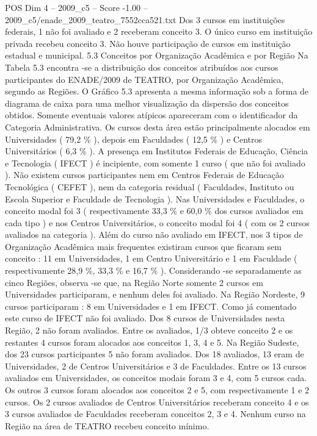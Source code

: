 \begin{textsample}{POS Dim 4 – 2009\_c5 – Score -1.00 – 2009\_c5/enade\_2009\_teatro\_7552cca521.txt}
Dos 3 cursos em instituições federais, 1 não foi avaliado e 2 receberam conceito 3.
O único curso em instituição privada recebeu conceito 3.
Não houve participação de cursos em instituição estadual e municipal. 5.3 Conceitos por Organização Acadêmica e por Região Na Tabela 5.3 encontra -se a distribuição dos conceitos atribuídos aos cursos participantes do ENADE/2009 de TEATRO, por Organização Acadêmica, segundo as Regiões.
O Gráfico 5.3 apresenta a mesma informação sob a forma de diagrama de caixa para uma melhor visualização da dispersão dos conceitos obtidos.
Somente eventuais valores atípicos apareceram com o identificador da Categoria Administrativa.
Os cursos desta área estão principalmente alocados em Universidades ( 79,2 \% ), depois em Faculdades ( 12,5 \% ) e Centros Universitários ( 6,3 \% ).
A presença em Institutos Federais de Educação, Ciência e Tecnologia ( IFECT ) é incipiente, com somente 1 curso ( que não foi avaliado ).
Não existem cursos participantes nem em Centros Federais de Educação Tecnológica ( CEFET ), nem da categoria residual ( Faculdades, Instituto ou Escola Superior e Faculdade de Tecnologia ).
Nas Universidades e Faculdades, o conceito modal foi 3 ( respectivamente 33,3 \% e 60,0 \% dos cursos avaliados em cada tipo ) e nos Centros Universitários, o conceito modal foi 4 ( com os 2 cursos avaliados na categoria ).
Além do curso não avaliado em IFECT, nos 3 tipos de Organização Acadêmica mais frequentes existiram cursos que ficaram sem conceito : 11 em Universidades, 1 em Centro Universitário e 1 em Faculdade ( respectivamente 28,9 \%, 33,3 \% e 16,7 \% ).
Considerando -se separadamente as cinco Regiões, observa -se que, na Região Norte somente 2 cursos em Universidades participaram, e nenhum deles foi avaliado.
Na Região Nordeste, 9 cursos participaram : 8 em Universidades e 1 em IFECT.
Como já comentado este curso de IFECT não foi avaliado.
Dos 8 cursos de Universidades nesta Região, 2 não foram avaliados.
Entre os avaliados, 1/3 obteve conceito 2 e os restantes 4 cursos foram alocados aos conceitos 1, 3, 4 e 5.
Na Região Sudeste, dos 23 cursos participantes 5 não foram avaliados.
Dos 18 avaliados, 13 eram de Universidades, 2 de Centros Universitários e 3 de Faculdades.
Entre os 13 cursos avaliados em Universidades, os conceitos modais foram 3 e 4, com 5 cursos cada.
Os outros 3 cursos foram alocados aos conceitos 2 e 5, com respectivamente 1 e 2 cursos.
Os 2 cursos avaliados de Centros Universitários receberam conceito 4 e os 3 cursos avaliados de Faculdades receberam conceitos 2, 3 e 4.
Nenhum curso na Região na área de TEATRO recebeu conceito mínimo.

\end{textsample}
